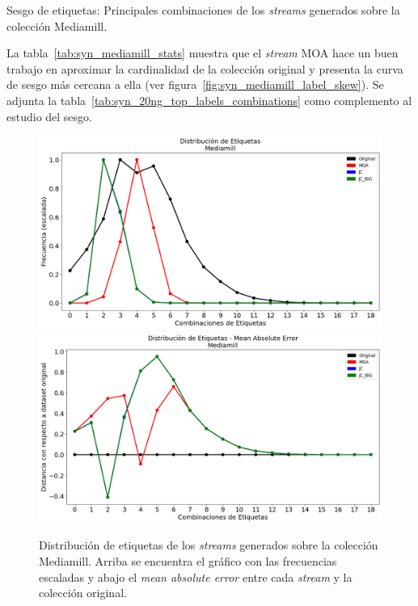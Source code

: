 \begin{table}[htbp]
	\centering
	\begin{adjustbox}{max width=\textwidth}
		
	\end{adjustbox}
	\caption{Sesgo de etiquetas: Principales combinaciones de los
		\textit{streams} generados sobre la colección Mediamill.}
	\label{tab:syn_mediamill_top_labels_combinations}
\end{table}

La tabla~\ref{tab:syn_mediamill_stats} muestra que el \textit{stream} MOA hace
un buen trabajo en aproximar la cardinalidad de la colección original y presenta
la curva de sesgo más cercana a ella (ver
figura~\ref{fig:syn_mediamill_label_skew}). Se adjunta la
tabla~\ref{tab:syn_20ng_top_labels_combinations} como complemento al estudio del
sesgo.

\begin{figure}[htbp]
	\includegraphics[width=\linewidth]{figures/experiments/syn/mediamill/label_distribution.png}
	\includegraphics[width=\linewidth]{figures/experiments/syn/mediamill/ld_mae.png}
	\caption[Distribución de etiquetas de los \textit{streams} generados sobre la colección
		Mediamill.]{Distribución de etiquetas de los \textit{streams} generados sobre la colección
		Mediamill. Arriba se encuentra el gráfico con las frecuencias escaladas y
		abajo el \textit{mean absolute error} entre cada \textit{stream} y la
		colección original.}
	\label{fig:syn_mediamill_label_distribution}
\end{figure}

